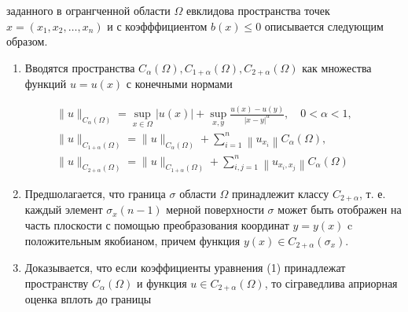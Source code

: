 \documentclass[10pt]{article}
\begin{document}
заданного в огрангченной области $\Omega$ евклидова пространства точек $x=\left(x_{1}, x_{2}, \ldots, x_{n}\right)$ и с коэфффициентом $b(x) \leqslant 0$ описывается следующим образом.



\begin{enumerate}

  \item Вводятся пространства $C_{\alpha}(\Omega), C_{1+\alpha}(\Omega), C_{2+\alpha}(\Omega)$ как множества функций $u=u(x)$ с конечными нормами

\end{enumerate}



\[

\begin{gathered}

\|u\|_{C_{\alpha}(\Omega)}=\sup _{x \in \Omega}|u(x)|+\sup _{x, y} \frac{u(x)-u(y)}{|x-y|^{\alpha}}, \quad 0<\alpha<1, \\

\|u\|_{C_{1+\alpha}(\Omega)}=\|u\|_{C_{\alpha}(\Omega)}+\sum_{i=1}^{n}\left\|u_{x_{i}}\right\| C_{\alpha}(\Omega), \\

\|u\|_{C_{2+\alpha}(\Omega)}=\|u\|_{C_{1+\alpha}(\Omega)}+\sum_{i, j=1}^{n}\left\|u_{x_{i}, x_{j}}\right\| C_{\alpha}(\Omega)

\end{gathered}

\]



\begin{enumerate}

  \setcounter{enumi}{1}

  \item Предшолагается, что граница $\sigma$ области $\Omega$ принадлежит классу $C_{2+\alpha}$, т. е. каждый элемент $\sigma_{x}(n-1)$ мерной поверхности $\sigma$ может быть отображен на часть плоскости с помощью преобразования координат $y=y(x)$ c положительным якобианом, причем функция $y(x) \in C_{2+\alpha}\left(\sigma_{x}\right)$.



  \item Доказывается, что если коэффициенты уравнения (1) принадлежат пространству $C_{\alpha}(\Omega)$ и функция $u \in C_{2+\alpha}(\Omega)$, то сіграведлива априорная оценка вплоть до границы



\end{enumerate}
\end{document}
